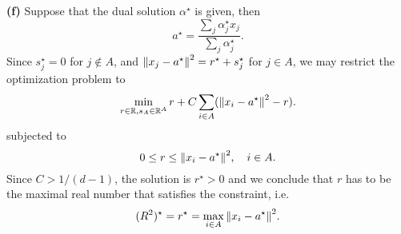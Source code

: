 \documentclass{article}
\makeatletter
\newcommand*{\shifttext}[1]{%
  \settowidth{\@tempdima}{#1}%
  \hspace{-\@tempdima}#1%
}
\newcommand{\plabel}[1]{%
\shifttext{\textbf{#1}\quad}%
}
\makeatother
\begin{document}
\plabel{(f)}%
Suppose that the dual solution $\alpha^\star$ is given, then
\[ a^\star = \frac{\sum_j \alpha^\star_j x_j}{\sum_j \alpha^\star_j}. \]
Since $s^\star_j = 0$ for $j\notin A$, and $\norm{x_j - a^\star}^2 = r^\star + s^\star_j$ for $j\in A$, we may restrict the optimization problem to
\[ \min_{r\in\mathbb{R},s_A\in \mathbb{R}^A} r + C\sum_{i\in A}(\norm{x_i - a^\star}^2 - r). \]
subjected to
\[ 0 \le r \le \norm{x_i - a^\star}^2,\quad i\in A. \]
Since $C>1/(d-1)$, the solution is $r^\star > 0$ and we conclude that $r$ has to be the maximal real number that satisfies the constraint, i.e.
\[ (R^2)^\star = r^\star = \max_{i\in A} \norm{x_i - a^\star}^2. \]

% 
% 
\end{document}
